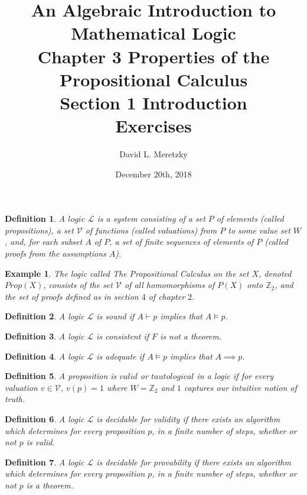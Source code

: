 \documentclass{article}
\title{ \vspace{-10ex} %
An Algebraic Introduction to Mathematical Logic\\
Chapter 3 Properties of the Propositional Calculus \\
Section 1 Introduction  \\
Exercises 
}
\author{David L. Meretzky
}
\date{%
December 20th, 2018
}
\theoremstyle{problemstyle}
\theoremstyle{problemstyle}
\newtheorem{definition}{Definition}
\theoremstyle{problemstyle}
\newtheorem{example}{Example}
\begin{document}
\maketitle

\begin{definition}
A $\textit{logic}$ $\mathscr{L}$ is a system consisting of a set $P$ of elements (called propositions), a set $\mathscr{V}$ of functions (called valuations) from $P$ to some value set $W$, and, for each subset $A$ of $P$, a set of finite sequences of elements of $P$ (called proofs from the assumptions $A$). 
\end{definition}

\begin{example}
The logic called The Propositional Calculus on the set $X$, denoted $Prop(X)$, consists of the set $\mathscr{V}$ of all homomorphisms of $P(X)$ onto $\mathbb{Z}_2$, and the set of proofs defined as in section $4$ of chapter $2$.  
\end{example}

\begin{definition}
A logic $\mathscr{L}$ is \textit{sound} if $A \vdash p$ implies that $A \models p$. 
\end{definition}

\begin{definition}
A logic $\mathscr{L}$ is \textit{consistent} if $F$ is not a theorem. 
\end{definition}

\begin{definition}
A logic $\mathscr{L}$ is \textit{adequate} if $A \models p$ implies that $A \implies p$. 
\end{definition}

\begin{definition}
A proposition is $valid$ or $tautological$ in a logic if for every valuation $v \in \mathscr{V}$, $v(p) = 1$ where $W = \mathbb{Z}_2$ and $1$ captures our intuitive notion of truth.
\end{definition}

\begin{definition}
A logic $\mathscr{L}$ is \textit{decidable for validity} if there exists an algorithm which determines for every proposition $p$, in a finite number of steps, whether or not $p$ is valid. 
\end{definition}

\begin{definition}
A logic $\mathscr{L}$ is \textit{decidable for provability} if there exists an algorithm which determines for every proposition $p$, in a finite number of steps, whether or not $p$ is a theorem. 
\end{definition}
\end{document}
